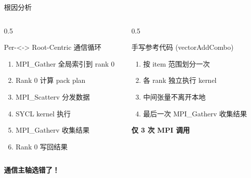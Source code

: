 \documentclass[aspectratio=169,10pt]{beamer}
\begin{document}
\begin{frame}{根因分析}
\begin{columns}
\begin{column}{0.5\textwidth}
\begin{block}{Per-<-> Root-Centric 通信循环}
\begin{enumerate}
    \item MPI\_Gather 全局索引到 rank 0
    \item Rank 0 计算 pack plan
    \item MPI\_Scatterv 分发数据
    \item SYCL kernel 执行
    \item MPI\_Gatherv 收集结果
    \item Rank 0 写回结果
\end{enumerate}
\end{block}
\end{column}
\begin{column}{0.5\textwidth}
\begin{block}{手写参考代码 (vectorAddCombo)}
\begin{enumerate}
    \item 按 item 范围划分一次
    \item 各 rank 独立执行 kernel
    \item 中间张量不离开本地
    \item 最后一次 MPI\_Gatherv 收集结果
\end{enumerate}
\textbf{仅 3 次 MPI 调用}
\end{block}
\end{column}
\end{columns}

\bigskip
\begin{center}
\Large\textbf{通信主轴选错了！}
\end{center}
\end{frame}

\end{document}
